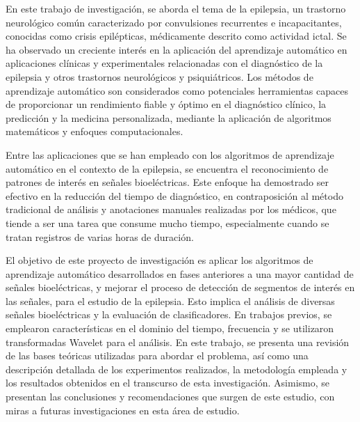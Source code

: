 

En este trabajo de investigación, se aborda el tema de la epilepsia, un trastorno neurológico común caracterizado por convulsiones recurrentes e incapacitantes, conocidas como crisis epilépticas, médicamente descrito como actividad ictal. Se ha observado un creciente interés en la aplicación del aprendizaje automático en aplicaciones clínicas y experimentales relacionadas con el diagnóstico de la epilepsia y otros trastornos neurológicos y psiquiátricos. Los métodos de aprendizaje automático son considerados como potenciales herramientas capaces de proporcionar un rendimiento fiable y óptimo en el diagnóstico clínico, la predicción y la medicina personalizada, mediante la aplicación de algoritmos matemáticos y enfoques computacionales.

Entre las aplicaciones que se han empleado con los algoritmos de aprendizaje automático en el contexto de la epilepsia, se encuentra el reconocimiento de patrones de interés en señales bioeléctricas. Este enfoque ha demostrado ser efectivo en la reducción del tiempo de diagnóstico, en contraposición al método tradicional de análisis y anotaciones manuales realizadas por los médicos, que tiende a ser una tarea que consume mucho tiempo, especialmente cuando se tratan registros de varias horas de duración.

El objetivo de este proyecto de investigación es aplicar los algoritmos de aprendizaje automático desarrollados en fases anteriores a una mayor cantidad de señales bioeléctricas, y mejorar el proceso de detección de segmentos de interés en las señales, para el estudio de la epilepsia.
Esto implica el análisis de diversas señales bioeléctricas y la evaluación de clasificadores. En trabajos previos, se emplearon características en el dominio del tiempo, frecuencia y se utilizaron transformadas Wavelet para el análisis. 
En este trabajo, se presenta una revisión de las bases teóricas utilizadas para abordar el problema, así como una descripción detallada de los experimentos realizados, la metodología empleada y los resultados obtenidos en el transcurso de esta investigación. Asimismo, se presentan las conclusiones y recomendaciones que surgen de este estudio, con miras a futuras investigaciones en esta área de estudio.

